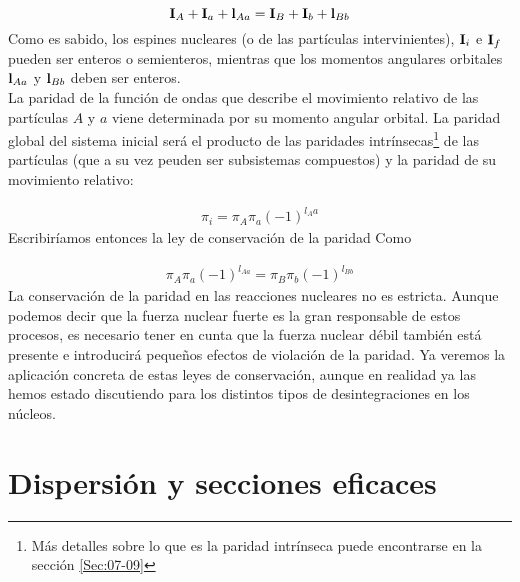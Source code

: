 \begin{equation}
    \mathbf{I}_A + \mathbf{I}_a + \mathbf{l}_{Aa} = \mathbf{I}_B + \mathbf{I}_b + \mathbf{l}_{Bb} 
\end{equation}
Como es sabido, los espines nucleares (o de las partículas intervinientes), $\mathbf{I}_i$ e $\mathbf{I}_f$ pueden ser enteros o semienteros, mientras que los momentos angulares orbitales $\mathbf{l}_{Aa}$ y $\mathbf{l}_{Bb}$ deben ser enteros. \\


La paridad de la función de ondas que describe el movimiento relativo de las partículas $A$ y $a$ viene determinada por su momento angular orbital. La paridad global del sistema inicial será el producto de las paridades intrínsecas\footnote{Más detalles sobre lo que es la paridad intrínseca puede encontrarse en la sección \ref{Sec:07-09}} de las partículas (que a su vez peuden ser subsistemas compuestos) y la paridad de su movimiento relativo:

\begin{eqnarray}
    \pi_i = \pi_A \pi_a (-1)^{l_Aa}
\end{eqnarray}
Escribiríamos entonces la ley de conservación de la paridad Como

\begin{eqnarray}
    \pi_A \pi_a (-1)^{l_{Aa}} = \pi_B \pi_b (-1)^{l_{Bb}}
\end{eqnarray}
La conservación de la paridad en las reacciones nucleares no es estricta. Aunque podemos decir que la fuerza nuclear fuerte es la gran responsable de estos procesos, es necesario tener en cunta que la fuerza nuclear débil también está presente e introducirá pequeños efectos de violación de la paridad. Ya veremos la aplicación concreta de estas leyes de conservación, aunque en realidad ya las hemos estado discutiendo para los distintos tipos de desintegraciones en los núcleos.

\section{Dispersión y secciones eficaces}

